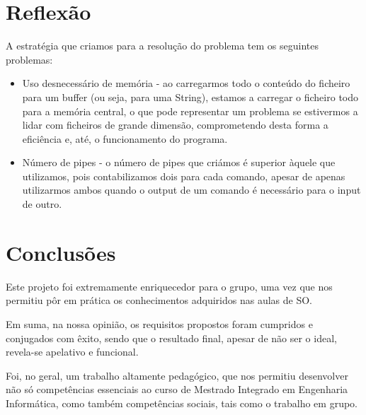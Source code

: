 \documentclass[a4paper]{article}
\begin{document}
\section{Reflexão}
\label{sec:reflexao}

A estratégia que criamos para a resolução do problema tem os seguintes problemas:

\begin{itemize}
  \item{Uso desnecessário de memória - ao carregarmos todo o conteúdo do ficheiro para um buffer (ou seja, para uma String), estamos a carregar o ficheiro 
  todo para a memória central, o que pode representar um problema se estivermos a lidar com ficheiros de grande dimensão, comprometendo desta forma a eficiência 
  e, até, o funcionamento do programa.}
  \item{Número de pipes - o número de pipes que criámos é superior àquele que utilizamos, pois contabilizamos dois para cada comando, apesar de apenas utilizarmos 
  ambos quando o output de um comando é necessário para o input de outro.}
\end{itemize}


\section{Conclusões}
\label{sec:conclusao}

Este projeto foi extremamente enriquecedor para o grupo, uma vez que nos permitiu pôr em prática os conhecimentos adquiridos nas aulas de SO.

Em suma, na nossa opinião, os requisitos propostos foram cumpridos e conjugados com êxito, sendo que o resultado final, apesar de não ser o ideal, revela-se apelativo e funcional.

Foi, no geral, um trabalho  altamente pedagógico, que nos permitiu desenvolver não só competências essenciais ao curso de Mestrado Integrado em Engenharia Informática, como também competências sociais, tais como o trabalho em grupo.
\end{document}

